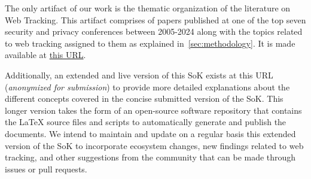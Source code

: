 The only artifact of our work is the thematic organization of the literature on Web Tracking. This artifact comprises of papers published at one of the top seven security and privacy conferences between 2005-2024 along with the topics related to web tracking assigned to them as explained in~\autoref{sec:methodology}. It is made available at \href{https://osf.io/zsy7e/overview?view_only=a346b98bf89244b5b17d842f6fb3fb13}{this URL}.

Additionally, an extended and live version of this SoK exists at this URL (\textit{anonymized for submission}) to provide more detailed explanations about the different concepts covered in the concise submitted version of the SoK. This longer version takes the form of an open-source software repository that contains the \LaTeX{} source files and scripts to automatically generate and publish the documents. We intend to maintain and update on a regular basis this extended version of the SoK to incorporate ecosystem changes, new findings related to web tracking, and other suggestions from the community that can be made through issues or pull requests.
